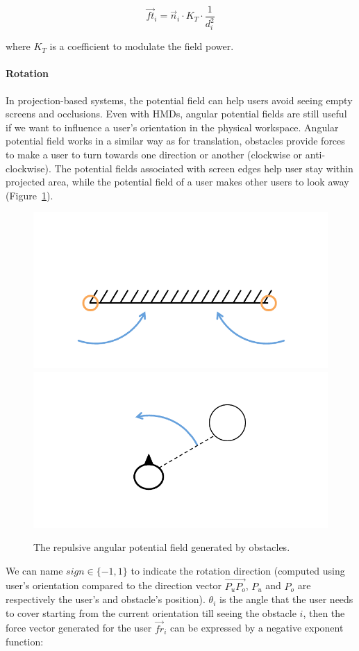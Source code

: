 \begin{equation}
\overrightarrow{ft}_{i}=\overrightarrow{n}_{i} \cdot K_{T} \cdot \frac{1}{d_{i}^2}
\end{equation}

where $K_{T}$ is a coefficient to modulate the field power.

\paragraph{Rotation}
In projection-based systems, the potential field can help users avoid seeing empty screens and occlusions. Even with HMDs, angular potential fields are still useful if we want to influence a user's orientation in the physical workspace. Angular potential field works in a similar way as for translation, obstacles provide forces to make a user to turn towards one direction or another (clockwise or anti-clockwise). The potential fields associated with screen edges help user stay within projected area, while the potential field of a user makes other users to look away (Figure~\ref{fig:5_pf_r}).

\begin{figure}[htb]
  \centering
  \includegraphics[width=.49\textwidth]{figures/ch5/pf_r_wall}
  \includegraphics[width=.49\textwidth]{figures/ch5/pf_r_user}
  \caption{\label{fig:5_pf_r}The repulsive angular potential field generated by obstacles.}
\end{figure}

We can name $sign \in \{-1, 1\}$ to indicate the rotation direction (computed using user's orientation compared to the direction vector $\overrightarrow{P_{u}P_{o}}$, $P_{u}$ and $P_{o}$ are respectively the user's and obstacle's position). $\theta_{i}$ is the angle that the user needs to cover starting from the current orientation till seeing the obstacle $i$, then the force vector generated for the user $\overrightarrow{fr}_{i}$ can be expressed by a negative exponent function:

